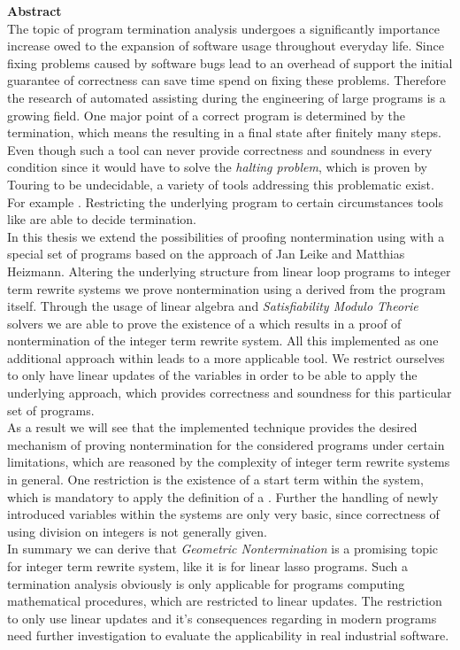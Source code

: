 {\bf\Large Abstract} \\ [1em] 

The topic of program termination analysis undergoes a significantly importance increase owed to the expansion of software usage throughout everyday life. Since fixing problems caused by software bugs lead to an overhead of support the initial guarantee of correctness can save time spend on fixing these problems. Therefore the research of automated assisting during the engineering of large programs is a growing field.
One major point of a correct program is determined by the termination, which means the resulting in a final state after finitely many steps. Even though such a tool can never provide correctness and soundness in every condition since it would have to solve the \textit{halting problem}, which is proven by Touring to be undecidable, a variety of tools addressing this problematic exist. For example \aprove. Restricting the underlying program to certain circumstances tools like \aprove are able to decide termination.\newline \\
In this thesis we extend the possibilities of proofing nontermination using \aprove with a special set of programs based on the  approach of Jan Leike and Matthias Heizmann. Altering the underlying structure from linear loop programs to integer term rewrite systems we prove nontermination using a \gna derived from the program itself. Through the usage of linear algebra and \textit{Satisfiability Modulo Theorie} solvers we are able to prove the existence of a \gna which results in a proof of nontermination of the integer term rewrite system. All this implemented as one additional approach within \aprove leads to a more applicable tool. We restrict ourselves to only have linear updates of the variables in order to be able to apply the underlying approach, which provides correctness and soundness for this particular set of programs.\newline
\\
As a result we will see that the implemented technique provides the desired mechanism of proving nontermination for the considered programs under certain limitations, which are reasoned by the complexity of integer term rewrite systems in general. One restriction is the existence of a start term within the system, which is mandatory to apply the definition of a \gna. Further the handling of newly introduced variables within the systems are only very basic, since correctness of using division on integers is not generally given. \newline
\\
In summary we can derive that \textit{Geometric Nontermination} is a promising topic for integer term rewrite system, like it is for linear lasso programs. Such a termination analysis obviously is only applicable for programs computing mathematical procedures, which are restricted to linear updates. The restriction to only use linear updates and it's consequences regarding in modern programs need further investigation to evaluate the applicability in real industrial software.
